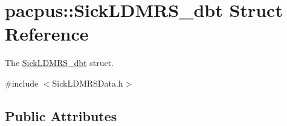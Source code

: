 \hypertarget{structpacpus_1_1SickLDMRS__dbt}{\section{pacpus\-:\-:Sick\-L\-D\-M\-R\-S\-\_\-dbt Struct Reference}
\label{structpacpus_1_1SickLDMRS__dbt}
}


The \hyperlink{structpacpus_1_1SickLDMRS__dbt}{Sick\-L\-D\-M\-R\-S\-\_\-dbt} struct.  




{\ttfamily \#include $<$Sick\-L\-D\-M\-R\-S\-Data.\-h$>$}

\subsection*{Public Attributes}

